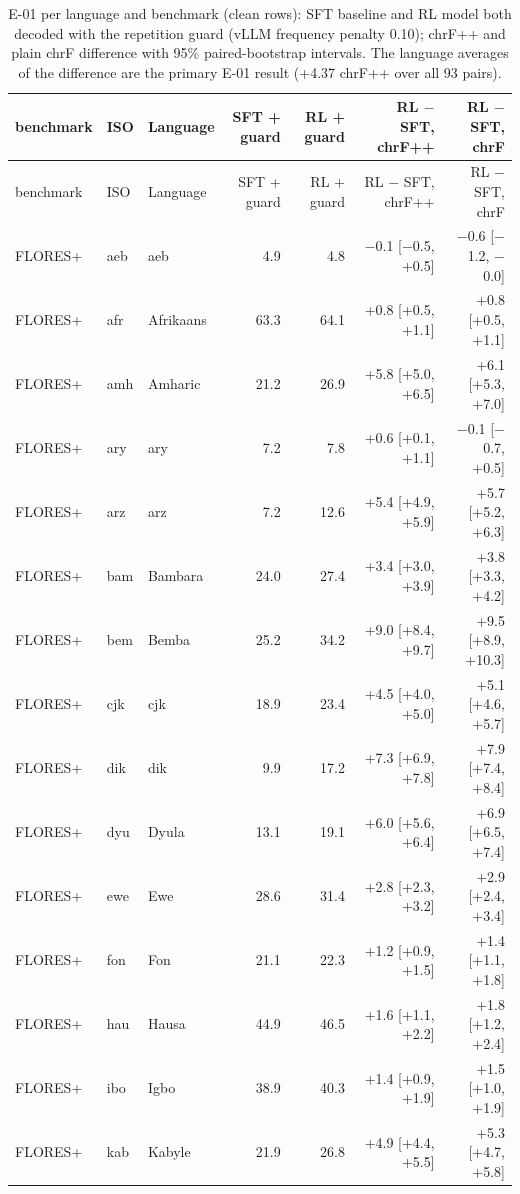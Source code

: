 {\scriptsize\setlength{\tabcolsep}{1.5pt}
\begin{longtable}{@{}lllrrrr@{}}
\caption{E-01 per language and benchmark (clean rows): SFT baseline and RL model both decoded with the repetition guard (vLLM frequency penalty 0.10); chrF++ and plain chrF difference with 95\% paired-bootstrap intervals. The language averages of the difference are the primary E-01 result (+4.37 chrF++ over all 93 pairs).}\label{tab:e01-per-language}\\
\toprule
benchmark & ISO & Language & SFT + guard & RL + guard & RL $-$ SFT, chrF++ & RL $-$ SFT, chrF \\
\midrule\endfirsthead
\toprule
benchmark & ISO & Language & SFT + guard & RL + guard & RL $-$ SFT, chrF++ & RL $-$ SFT, chrF \\
\midrule\endhead
\midrule\endfoot
\bottomrule\endlastfoot
FLORES+ & aeb & aeb & 4.9 & 4.8 & $-$0.1 [$-$0.5, +0.5] & $-$0.6 [$-$1.2, $-$0.0] \\
FLORES+ & afr & Afrikaans & 63.3 & 64.1 & +0.8 [+0.5, +1.1] & +0.8 [+0.5, +1.1] \\
FLORES+ & amh & Amharic & 21.2 & 26.9 & +5.8 [+5.0, +6.5] & +6.1 [+5.3, +7.0] \\
FLORES+ & ary & ary & 7.2 & 7.8 & +0.6 [+0.1, +1.1] & $-$0.1 [$-$0.7, +0.5] \\
FLORES+ & arz & arz & 7.2 & 12.6 & +5.4 [+4.9, +5.9] & +5.7 [+5.2, +6.3] \\
FLORES+ & bam & Bambara & 24.0 & 27.4 & +3.4 [+3.0, +3.9] & +3.8 [+3.3, +4.2] \\
FLORES+ & bem & Bemba & 25.2 & 34.2 & +9.0 [+8.4, +9.7] & +9.5 [+8.9, +10.3] \\
FLORES+ & cjk & cjk & 18.9 & 23.4 & +4.5 [+4.0, +5.0] & +5.1 [+4.6, +5.7] \\
FLORES+ & dik & dik & 9.9 & 17.2 & +7.3 [+6.9, +7.8] & +7.9 [+7.4, +8.4] \\
FLORES+ & dyu & Dyula & 13.1 & 19.1 & +6.0 [+5.6, +6.4] & +6.9 [+6.5, +7.4] \\
FLORES+ & ewe & Ewe & 28.6 & 31.4 & +2.8 [+2.3, +3.2] & +2.9 [+2.4, +3.4] \\
FLORES+ & fon & Fon & 21.1 & 22.3 & +1.2 [+0.9, +1.5] & +1.4 [+1.1, +1.8] \\
FLORES+ & hau & Hausa & 44.9 & 46.5 & +1.6 [+1.1, +2.2] & +1.8 [+1.2, +2.4] \\
FLORES+ & ibo & Igbo & 38.9 & 40.3 & +1.4 [+0.9, +1.9] & +1.5 [+1.0, +1.9] \\
FLORES+ & kab & Kabyle & 21.9 & 26.8 & +4.9 [+4.4, +5.5] & +5.3 [+4.7, +5.8] \\

\end{longtable}}
